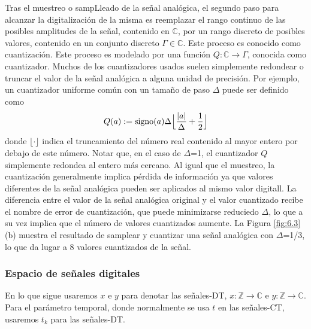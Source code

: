\documentclass{article}
\begin{document}
Tras el muestreo o sampLleado de la señal analógica, el segundo paso para alcanzar la digitalización de la misma es reemplazar el rango continuo de las posibles amplitudes de la señal, contenido en $\mathbb{C}$, por un rango discreto de posibles valores, contenido en un conjunto discreto $\Gamma\in\mathbb{C}$. Este proceso es conocido como cuantización. Este proceso es modelado por una función $Q:\mathbb{C}\rightarrow\Gamma$, conocida como cuantizador. Muchos de los cuantizadores usados suelen simplemente redondear o truncar el valor de la señal analógica a alguna unidad de precisión. Por ejemplo, un cuantizador uniforme común con un tamaño de paso $\Delta$ puede ser definido como
\begin{equation}
    Q(a):=\mathrm{signo}(a)\Delta\Bigl\lfloor\frac{\abs{a}}{\Delta}+\frac{1}{2}\Bigr\rfloor
\end{equation}
donde $\lfloor·\rfloor$ indica el truncamiento del número real contenido al mayor entero por debajo de este número. Notar que, en el caso de $\Delta$=1, el cuantizador $Q$ simplemente redondea al entero más cercano. Al igual que el muestreo, la cuantización generalmente implica pérdida de información ya que valores diferentes de la señal analógica pueden ser aplicados al mismo valor digitall. La diferencia entre el valor de la señal analógica original y el valor cuantizado recibe el nombre de error de cuantización, que puede minimizarse reduciedo $\Delta$, lo que a su vez implica que el número de valores cuantizados aumente. La Figura \ref{fig:6.3}(b) muestra el resultado de samplear y cuantizar una señal analógica con $\Delta$=1/3, lo que da lugar a 8 valores cuantizados de la señal.


\subsubsection{Espacio de señales digitales}

En lo que sigue usaremos $x$ e $y$ para denotar las señales-DT, $x\colon \mathbb{Z}\rightarrow\mathbb{C}$ e $y \colon \mathbb{Z}\rightarrow\mathbb{C}$. Para el parámetro temporal, donde normalmente se usa $t$ en las señales-CT, usaremos $t_k$ para las señales-DT.
\end{document}
